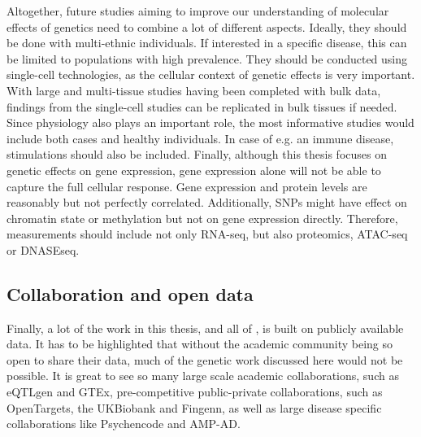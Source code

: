 Altogether, future studies aiming to improve our understanding of molecular effects of genetics need to combine a lot of different aspects. Ideally, they should be done with multi-ethnic individuals. If interested in a specific disease, this can be limited to populations with high prevalence. They should be conducted using single-cell technologies, as the cellular context of genetic effects is very important. With large\cite{vosaUnravelingPolygenicArchitecture2018c} and multi-tissue\cite{GTExConsortiumAtlas} studies having been completed with bulk data, findings from the single-cell studies can be replicated in bulk tissues if needed. Since physiology also plays an important role, the most informative studies would include both cases and healthy individuals. In case of e.g. an immune disease, stimulations should also be included. Finally, although this thesis focuses on genetic effects on gene expression, gene expression alone will not be able to capture the full cellular response. Gene expression and protein levels are reasonably but not perfectly correlated\cite{buccitelliMRNAsProteinsEmerging2020}. Additionally, SNPs might have effect on chromatin state or methylation but not on gene expression directly. Therefore, measurements should include not only RNA-seq, but also proteomics, ATAC-seq or DNASEseq.

\subsection{Collaboration and open data}
Finally, a lot of the work in this thesis, and all of , is built on publicly available data. It has to be highlighted that without the academic community being so open to share their data, much of the genetic work discussed here would not be possible. It is great to see so many large scale academic collaborations, such as eQTLgen\cite{vosaUnravelingPolygenicArchitecture2018c} and GTEx\cite{GTExConsortiumAtlas}, pre-competitive public-private collaborations, such as OpenTargets, the UKBiobank\cite{sudlowUKBiobankOpen2015a} and Fingenn\cite{fingennFinnGenDocumentationR32020}, as well as large disease specific collaborations like Psychencode\cite{DbGaPStudy,ngXQTLMapIntegrates2017,wangComprehensiveFunctionalGenomic2018} and AMP-AD\cite{hodesAcceleratingMedicinesPartnership2016}.




